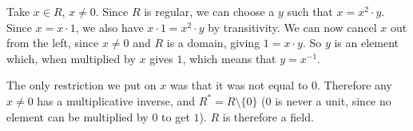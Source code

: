 \documentclass[a4paper,12pt]{article}
\begin{document}
Take $x \in R$, $x \neq 0$. Since $R$ is regular, we can choose a $y$ such that $x = x^2 \cdot y$. Since $x = x \cdot 1$, we also have $x \cdot 1 = x^2 \cdot y$ by transitivity. We can now cancel $x$ out from the left, since $x \neq 0$ and $R$ is a domain, giving $1 = x \cdot y$. So $y$ is an element which, when multiplied by $x$ gives $1$, which means that $y = x^{-1}$. 

The only restriction we put on $x$ was that it was not equal to $0$. Therefore any $x \neq 0$ has a multiplicative inverse, and $R^* = R \setminus \{0\}$ ($0$ is never a unit, since no element can be multiplied by $0$ to get $1$). $R$ is therefore a field.
\end{document}
